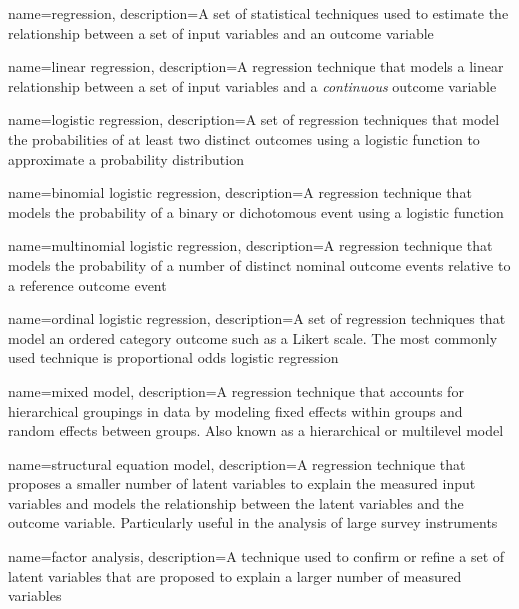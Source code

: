 {
    name={regression},
    description={A set of statistical techniques used to estimate the relationship between a set of input variables and an outcome variable}
}

{
    name={linear regression},
    description={A regression technique that models a linear relationship between a set of input variables and a \textit{continuous} outcome variable}
}

{
    name={logistic regression},
    description={A set of regression techniques that model the probabilities of at least two distinct outcomes using a logistic function to approximate a probability distribution}
}

{
    name={binomial logistic regression},
    description={A regression technique that models the probability of a binary or dichotomous event using a logistic function}
}

{
    name={multinomial logistic regression},
    description={A regression technique that models the probability of a number of distinct nominal outcome events relative to a reference outcome event}
}

{
    name={ordinal logistic regression},
    description={A set of regression techniques that model an ordered category outcome such as a Likert scale.  The most commonly used technique is proportional odds logistic regression}
}

{
    name={mixed model},
    description={A regression technique that accounts for hierarchical groupings in data by modeling fixed effects within groups and random effects between groups.  Also known as a hierarchical or multilevel model}
}

{
    name={structural equation model},
    description={A regression technique that proposes a smaller number of latent variables to explain the measured input variables and models the relationship between the latent variables and the outcome variable.  Particularly useful in the analysis of large survey instruments}
}

{
    name={factor analysis},
    description={A technique used to confirm or refine a set of latent variables that are proposed to explain a larger number of measured variables}
}

